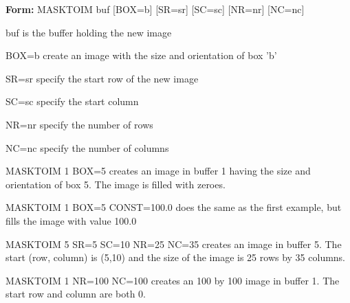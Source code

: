 {\newpage\clearpage
{}%
\begin{command}
  \item[\textbf{Form:}  MASKTOIM buf {[BOX=b]} {[SR=sr]} {[SC=sc]} {[NR=nr]} {[NC=nc]}\hfill]{}
  \item[buf]{is the buffer holding the new image}
  \item[BOX=b]{create an image with the size and orientation of box 'b'}
  \item[SR=sr]{specify the start row of the new image}
  \item[SC=sc]{specify the start column}
  \item[NR=nr]{specify the number of rows}
  \item[NC=nc]{specify the number of columns}
\end{command}%
\lthtmlfigureZ
\lthtmlcheckvsize\clearpage}

{\newpage\clearpage
{}%
\begin{example}
  \item[MASKTOIM 1 BOX=5\hfill]{creates an image in buffer 1 having the
       size and orientation of box 5.  The image is filled with zeroes.}
\par
\item[MASKTOIM 1 BOX=5 CONST=100.0\hfill]{does the same as the first
       example, but fills the image with value 100.0}
\par
\item[MASKTOIM 5 SR=5 SC=10 NR=25 NC=35\hfill]{creates an image in buffer
       5.  The start (row, column) is (5,10) and the size of the image is
       25 rows by 35 columns.}
\par
\item[MASKTOIM 1 NR=100 NC=100\hfill]{creates an 100 by 100 image in
       buffer 1.  The start row and column are both 0.}
\end{example}%
\lthtmlfigureZ
\lthtmlcheckvsize\clearpage}

